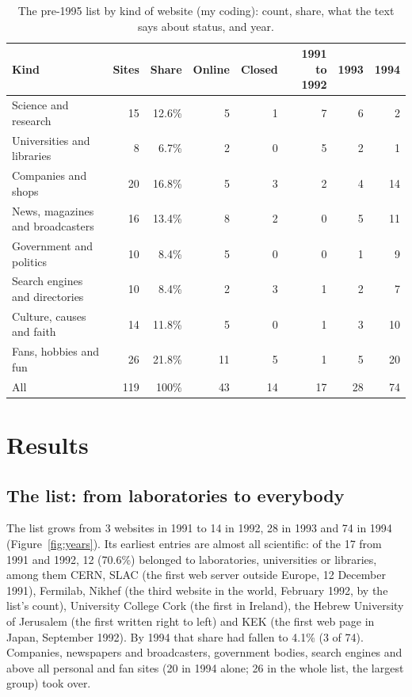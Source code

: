 \documentclass[11pt,a4paper]{article}
\begin{document}
\begin{table}[tbp]\centering\small\caption{The pre-1995 list by kind of website (my coding): count, share, what the text says about status, and year.}\label{tab:types}\begin{tabular}{lrrrrrrr}\toprule Kind & Sites & Share & Online & Closed & 1991 to 1992 & 1993 & 1994\\\midrule
Science and research & 15 & 12.6\% & 5 & 1 & 7 & 6 & 2\\
Universities and libraries & 8 & 6.7\% & 2 & 0 & 5 & 2 & 1\\
Companies and shops & 20 & 16.8\% & 5 & 3 & 2 & 4 & 14\\
News, magazines and broadcasters & 16 & 13.4\% & 8 & 2 & 0 & 5 & 11\\
Government and politics & 10 & 8.4\% & 5 & 0 & 0 & 1 & 9\\
Search engines and directories & 10 & 8.4\% & 2 & 3 & 1 & 2 & 7\\
Culture, causes and faith & 14 & 11.8\% & 5 & 0 & 1 & 3 & 10\\
Fans, hobbies and fun & 26 & 21.8\% & 11 & 5 & 1 & 5 & 20\\
\midrule All & 119 & 100\% & 43 & 14 & 17 & 28 & 74\\
\bottomrule\end{tabular}\end{table}

\section{Results}
\subsection{The list: from laboratories to everybody}
The list grows from 3 websites in 1991 to 14 in 1992, 28 in 1993 and 74 in 1994 (Figure~\ref{fig:years}). Its earliest entries are almost all scientific: of the 17 from 1991 and 1992, 12 (70.6\%) belonged to laboratories, universities or libraries, among them CERN, SLAC (the first web server outside Europe, 12 December 1991), Fermilab, Nikhef (the third website in the world, February 1992, by the list's count), University College Cork (the first in Ireland), the Hebrew University of Jerusalem (the first written right to left) and KEK (the first web page in Japan, September 1992). By 1994 that share had fallen to 4.1\% (3 of 74). Companies, newspapers and broadcasters, government bodies, search engines and above all personal and fan sites (20 in 1994 alone; 26 in the whole list, the largest group) took over.
\end{document}
